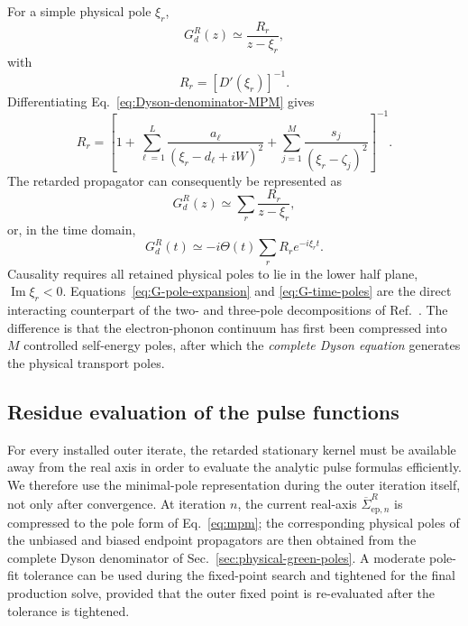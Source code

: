 \documentclass[
 reprint,
 superscriptaddress,
 amsmath,amssymb,
 aps,prb,
 longbibliography,
 floatfix
]{revtex4-2}
\newcommand{\ep}{\mathrm{ep}}
\newcommand{\barSigma}{\overline{\Sigma}}
\begin{document}
For a simple physical pole $\xi_r$,
\begin{equation*}
G_d^R(z)
\simeq
\frac{R_r}{z-\xi_r},
\end{equation*}
with
\begin{equation*}
R_r
=
\left[
D'(\xi_r)
\right]^{-1}.
\end{equation*}
Differentiating Eq.~\eqref{eq:Dyson-denominator-MPM} gives
\begin{equation*}
R_r
=
\left[
1
+
\sum_{\ell=1}^{L}
\frac{a_\ell}
{(\xi_r-d_\ell+iW)^2}
+
\sum_{j=1}^{M}
\frac{s_j}
{(\xi_r-\zeta_j)^2}
\right]^{-1}.
\end{equation*}
The retarded propagator can consequently be represented as
\begin{equation}
G_d^R(z)
\simeq
\sum_r
\frac{R_r}{z-\xi_r},
\label{eq:G-pole-expansion}
\end{equation}
or, in the time domain,
\begin{equation}
G_d^R(t)
\simeq
-i\Theta(t)
\sum_r
R_r e^{-i\xi_r t}.
\label{eq:G-time-poles}
\end{equation}
Causality requires all retained physical poles to lie in the lower half plane, $\operatorname{Im}\xi_r<0$. Equations~\eqref{eq:G-pole-expansion} and \eqref{eq:G-time-poles} are the direct interacting counterpart of the two- and three-pole decompositions of Ref.~\cite{MaciejkoWangGuo2006}. The difference is that the electron-phonon continuum has first been compressed into $M$ controlled self-energy poles, after which the \emph{complete Dyson equation} generates the physical transport poles.



\subsection{Residue evaluation of the pulse functions}
\label{sec:dot-residue-evaluation}

For every installed outer iterate, the retarded stationary kernel must be available away from the real axis in order to evaluate the analytic pulse formulas efficiently. We therefore use the minimal-pole representation during the outer iteration itself, not only after convergence. At iteration \(n\), the current real-axis \(\barSigma_{\ep,n}^{R}\) is compressed to the pole form of Eq.~\eqref{eq:mpm}; the corresponding physical poles of the unbiased and biased endpoint propagators are then obtained from the complete Dyson denominator of Sec.~\ref{sec:physical-green-poles}. A moderate pole-fit tolerance can be used during the fixed-point search and tightened for the final production solve, provided that the outer fixed point is re-evaluated after the tolerance is tightened.
\end{document}
